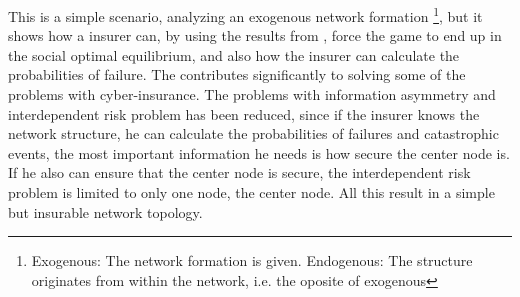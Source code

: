 This is a simple scenario, analyzing an exogenous network formation \footnote{Exogenous: The network formation is given. Endogenous: The structure originates from within the network, i.e. the oposite of exogenous}, 
but it shows how a insurer can, by using the results from \cite{lieberman2005evolutionary}, force the game to end up in the social optimal equilibrium, and also how the insurer can calculate the probabilities of failure. 
The contributes significantly to solving some of the problems with cyber-insurance. The problems with information asymmetry and interdependent risk problem has been reduced, since if the insurer knows the network structure, he can calculate the probabilities of failures and catastrophic events, the most important information he needs is how secure the center node is. If he also can ensure that the center node is secure, the interdependent risk problem is limited to only one node, the center node. All this result in a simple but insurable network topology.

   
